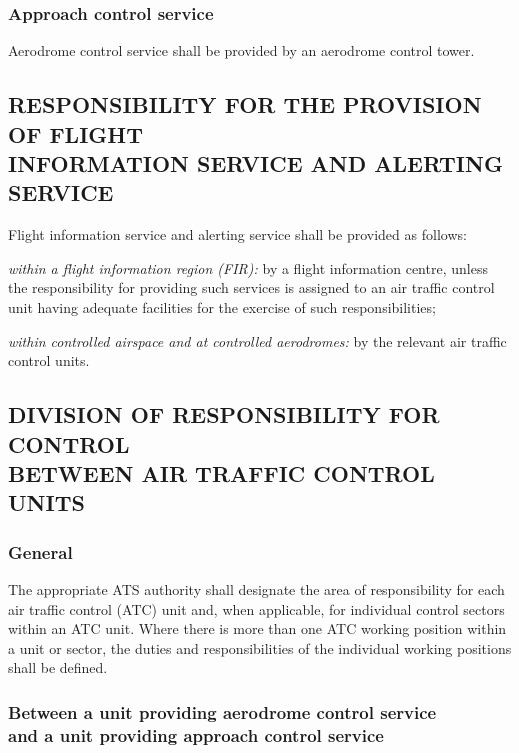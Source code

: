 \documentclass[../vATM.tex]{subfiles}
\begin{document}
    \subsubsection{Approach control service}

    Aerodrome control service shall be provided by an aerodrome control tower.

   \subsection[Responsibility for the provision of flight information service and alerting service]{RESPONSIBILITY FOR THE PROVISION OF FLIGHT \\ INFORMATION SERVICE AND ALERTING SERVICE}

    Flight information service and alerting service shall be provided as follows:
    \begin{enumalph}
        \item \textit{within a flight information region (FIR):} by a flight information centre, unless the responsibility for providing such services is assigned to an air traffic control unit having adequate facilities for the exercise of such responsibilities;
        \item \textit{within controlled airspace and at controlled aerodromes:} by the relevant air traffic control units.
    \end{enumalph}
    
    \subsection[Division of responsibility for control between air traffic control units]{DIVISION OF RESPONSIBILITY FOR CONTROL \\ BETWEEN AIR TRAFFIC CONTROL UNITS}
    
    \subsubsection{General}

    The appropriate ATS authority shall designate the area of responsibility for each air traffic control (ATC) unit and, when applicable, for individual control sectors within an ATC unit. Where there is more than one ATC working position within a unit or sector, the duties and responsibilities of the individual working positions shall be defined.

    \subsubsection[Between a unit providing aerodrome control service and a unit providing approach control service]{Between a unit providing aerodrome control service \\ and a unit providing approach control service}
\end{document}
